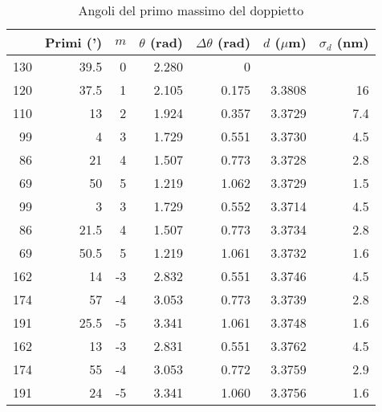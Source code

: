 \documentclass[a4paper,10pt]{article}
\begin{document}
	\begin{table}[htbp]
  \centering
  \caption{Angoli del primo massimo del doppietto}
  \medskip
    \begin{tabular}{rrrrrrr}
    \bottomrule
    \rowcolor[rgb]{ .267,  .447,  .769} \multicolumn{1}{l}{\textcolor[rgb]{ 1,  1,  1}{\textbf{Gradi (deg)}}} & \multicolumn{1}{l}{\textcolor[rgb]{ 1,  1,  1}{\textbf{Primi (')}}} & \multicolumn{1}{l}{\textcolor[rgb]{ 1,  1,  1}{\textbf{$m$}}} & \multicolumn{1}{l}{\textcolor[rgb]{ 1,  1,  1}{\textbf{$\theta$ (rad)}}} & \multicolumn{1}{l}{\textcolor[rgb]{ 1,  1,  1}{\textbf{$\Delta \theta$ (rad)}}} & \multicolumn{1}{l}{\textcolor[rgb]{ 1,  1,  1}{\textbf{$d$ ($ \mu $m)}}} & \multicolumn{1}{l}{\textcolor[rgb]{ 1,  1,  1}{\textbf{$\sigma _d$ (nm)}}} \\
    \toprule
\rowcolor[rgb]{ .851,  .851,  .851} 130   & 39.5  & 0     & 2.280 & 0     &       &  \\
    120   & 37.5  & 1     & 2.105 & 0.175 & 3.3808 & 16 \\
    \rowcolor[rgb]{ .851,  .851,  .851} 110   & 13    & 2     & 1.924 & 0.357 & 3.3729 & 7.4 \\
    99    & 4     & 3     & 1.729 & 0.551 & 3.3730 & 4.5 \\
    \rowcolor[rgb]{ .851,  .851,  .851} 86    & 21    & 4     & 1.507 & 0.773 & 3.3728 & 2.8 \\
    69    & 50    & 5     & 1.219 & 1.062 & 3.3729 & 1.5 \\
    \rowcolor[rgb]{ .851,  .851,  .851} 99    & 3     & 3     & 1.729 & 0.552 & 3.3714 & 4.5 \\
    86    & 21.5  & 4     & 1.507 & 0.773 & 3.3734 & 2.8 \\
    \rowcolor[rgb]{ .851,  .851,  .851} 69    & 50.5  & 5     & 1.219 & 1.061 & 3.3732 & 1.6 \\
    162   & 14    & -3    & 2.832 & 0.551 & 3.3746 & 4.5 \\
    \rowcolor[rgb]{ .851,  .851,  .851} 174   & 57    & -4    & 3.053 & 0.773 & 3.3739 & 2.8 \\
    191   & 25.5  & -5    & 3.341 & 1.061 & 3.3748 & 1.6 \\
    \rowcolor[rgb]{ .851,  .851,  .851} 162   & 13    & -3    & 2.831 & 0.551 & 3.3762 & 4.5 \\
    174   & 55    & -4    & 3.053 & 0.772 & 3.3759 & 2.9 \\
    \rowcolor[rgb]{ .851,  .851,  .851} 191   & 24    & -5    & 3.341 & 1.060 & 3.3756 & 1.6 \\
    \toprule
    \end{tabular}%
  \label{tab1}%
\end{table}%
\end{document}
